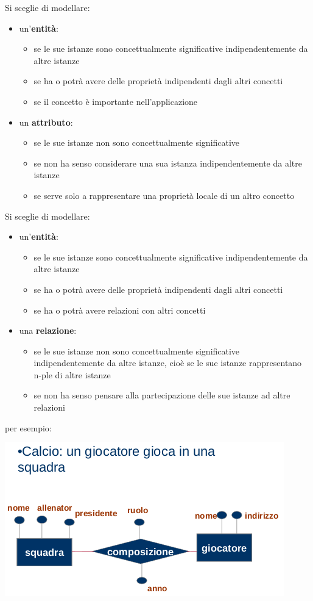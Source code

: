 \documentclass[a4paper,12pt, oneside]{book}
\begin{document}
Si sceglie di modellare:
\begin{itemize}
\item un'\textbf{entità}:
\begin{itemize}
\item se le sue istanze sono concettualmente significative
indipendentemente da altre istanze
\item se ha o potrà avere delle proprietà indipendenti dagli
altri concetti
\item se il concetto è importante nell'applicazione
\end{itemize}

\item un \textbf{attributo}:
\begin{itemize}
\item se le sue istanze non sono concettualmente significative
\item se non ha senso considerare una sua istanza
indipendentemente da altre istanze
\item se serve solo a rappresentare una proprietà locale di
un altro concetto
\end{itemize}
\end{itemize}
Si sceglie di modellare:
\begin{itemize}
\item un'\textbf{entità}:
\begin{itemize}
\item se le sue istanze sono concettualmente significative
indipendentemente da altre istanze
\item se ha o potrà avere delle proprietà indipendenti dagli
altri concetti
\item se ha o potrà avere relazioni con altri concetti
\end{itemize}
\item una \textbf{relazione}:
\begin{itemize}
\item se le sue istanze non sono concettualmente
significative indipendentemente da altre istanze, cioè
se le sue istanze rappresentano n-ple di altre istanze
\item se non ha senso pensare alla partecipazione delle sue
istanze ad altre relazioni
\end{itemize}
\end{itemize}
per esempio:
\begin{center}
\includegraphics[scale=1]{img/er2.png}
\end{center}
\end{document}
